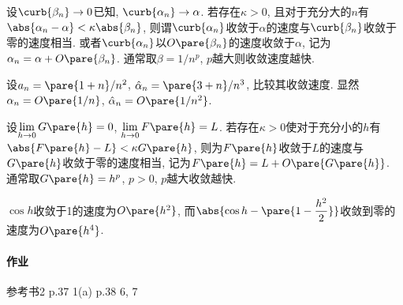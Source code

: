 \documentclass[hidelinks]{ctexart}
\begin{document}
\begin{definition}[序列的收敛速度]
    设$\curb{\beta_n}\rightarrow 0$已知, $\curb{\alpha_n}\rightarrow \alpha$. 若存在$\kappa>0$, 且对于充分大的$n$有$\abs{\alpha_n - \alpha} < \kappa\abs{\beta_n}$, 则谓$\curb{\alpha_n}$收敛于$\alpha$的速度与$\curb{\beta_n}$收敛于零的速度相当. 或者$\curb{\alpha_n}$以$O\pare{\beta_n}$的速度收敛于$\alpha$, 记为$\alpha_n = \alpha + O\pare{\beta_n}$. 通常取$\beta = 1/n^p$, $p$越大则收敛速度越快.
\end{definition}
\begin{ex}
    设$a_n = \pare{1+n}/n^2$, $\hat \alpha_n = \pare{3+n}/n^3$, 比较其收敛速度. 显然$\alpha_n = O\pare{1/n}$, $\hat \alpha_n = O\pare{1/n^2}$.
\end{ex}
\begin{definition}[函数的收敛速度]
    设$\displaystyle \lim_{h\rightarrow 0} G\pare{h} = 0$, $\displaystyle \lim_{h\rightarrow 0} F\pare{h} = L$. 若存在$\kappa>0$使对于充分小的$h$有$\abs{F\pare{h} - L} < \kappa G\pare{h}$, 则为$F\pare{h}$收敛于$L$的速度与$G\pare{h}$收敛于零的速度相当, 记为$F\pare{h} = L + O\pare{G\pare{h}}$. 通常取$G\pare{h}  =h^p$, $p>0$, $p$越大收敛越快.
\end{definition}
\begin{ex}
    $\cos h$收敛于1的速度为$O\pare{h^2}$, 而$\displaystyle \abs{\cos h - \pare{1-\frac{h^2}{2}}}$收敛到零的速度为$O\pare{h^4}$.
\end{ex}

\paragraph{作业} %
\label{par:作业}

参考书2 p.37 1(a) p.38 6, 7



\end{document}
